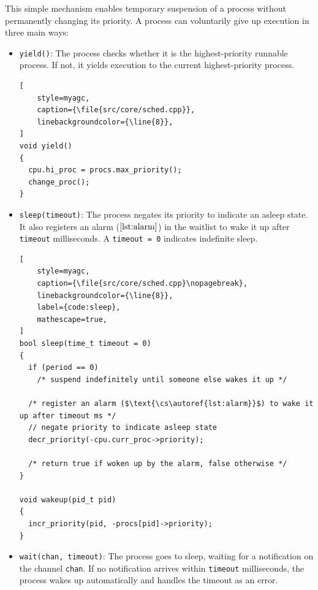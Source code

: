 This simple mechanism enables temporary suspension of a process without permanently
changing its priority. A process can voluntarily give up execution in three main ways:
\begin{itemize}[left=0pt]
    \item \lstinline[style=myagc]|yield()|: The process checks whether it is the
        highest-priority runnable process. If not, it yields execution to the current
        highest-priority process.

\begin{lstlisting}[
    style=myagc,
    caption={\file{src/core/sched.cpp}},
    linebackgroundcolor={\line{8}},
]
void yield()
{
  cpu.hi_proc = procs.max_priority();
  change_proc();
}
\end{lstlisting}

    \item \lstinline[style=myagc]|sleep(timeout)|: The process negates its priority to
        indicate an asleep state. It also registers an alarm
        ($\text{\autoref{lst:alarm}}$) in the waitlist to wake it up after
        \lstinline[style=myagc]|timeout| milliseconds. A
        \lstinline[style=myagc]|timeout = 0| indicates indefinite sleep.

        \vspace{1em}
\begin{lstlisting}[
    style=myagc,
    caption={\file{src/core/sched.cpp}\nopagebreak},
    linebackgroundcolor={\line{8}},
    label={code:sleep},
    mathescape=true,
]
bool sleep(time_t timeout = 0)
{
  if (period == 0)
    /* suspend indefinitely until someone else wakes it up */

  /* register an alarm ($\text{\cs\autoref{lst:alarm}}$) to wake it up after timeout ms */
  // negate priority to indicate asleep state
  decr_priority(-cpu.curr_proc->priority); 

  /* return true if woken up by the alarm, false otherwise */
}

void wakeup(pid_t pid) 
{
  incr_priority(pid, -procs[pid]->priority);
}
\end{lstlisting}

    \item \lstinline[style=myagc]|wait(chan, timeout)|: The process goes to sleep,
        waiting for a notification on the channel \lstinline[style=myagc]|chan|. If no
        notification arrives within \lstinline[style=myagc]|timeout| milliseconds, the
        process wakes up automatically and handles the timeout as an error.


\end{itemize}
